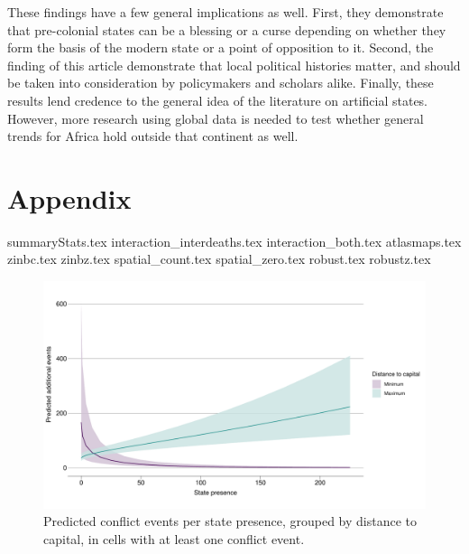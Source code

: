 These findings have a few general implications as well. First, they demonstrate
that pre-colonial states can be a blessing or a curse depending on whether they
form the basis of the modern state or a point of opposition to it. Second, the
finding of this article demonstrate that local political histories matter, and
should be taken into consideration by policymakers and scholars alike. Finally,
these results lend credence to the general idea of the literature on artificial
states. However, more research using global data is needed to test whether
general trends for Africa hold outside that continent as well.

\clearpage




\clearpage

\section{Appendix}

\pagestyle{plain}

{summaryStats.tex}
{interaction_interdeaths.tex}
{interaction_both.tex}
{atlasmaps.tex}
{zinbc.tex}
{zinbz.tex}
{spatial_count.tex}
{spatial_zero.tex}
{robust.tex}
{robustz.tex}


\begin{figure}[htpb]
	\centering
	\includegraphics[width=\linewidth]{"../R/Output/bothzinbplot.pdf"}
	\caption{Predicted conflict events per state presence, grouped by
	distance to capital, in cells with at least one conflict event.}
	\label{bothzinb_int}
\end{figure}

